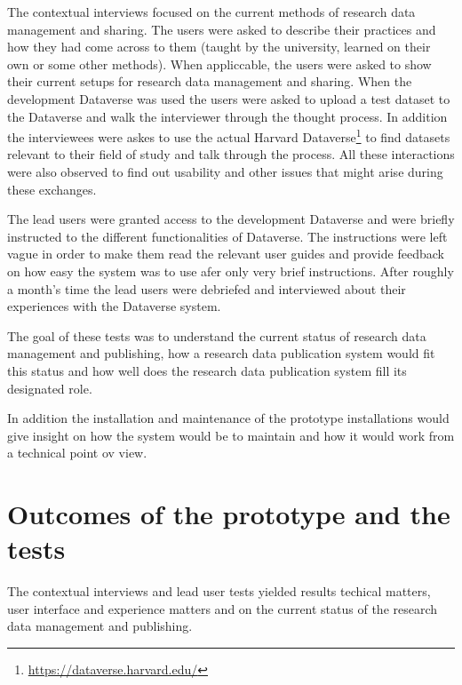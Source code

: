 The contextual interviews focused on the current methods of research data
management and sharing. The users were asked to describe their practices and
how they had come across to them (taught by the university, learned on their
own or some other methods). When appliccable, the users were asked to show
their current setups for research data management and sharing. When the
development Dataverse was used the users were asked to upload a test dataset
to the Dataverse and walk the interviewer through the thought process. In
addition the interviewees were askes to use the actual Harvard
Dataverse\footnote{\url{https://dataverse.harvard.edu/}} to find datasets
relevant to their field of study and talk through the process. All these
interactions were also observed to find out usability and other issues that
might arise during these exchanges.

The lead users were granted access to the development Dataverse and were
briefly instructed to the different functionalities of Dataverse. The
instructions were left vague in order to make them read the relevant user
guides and provide feedback on how easy the system was to use afer only very
brief instructions. After roughly a month's time the lead users were debriefed
and interviewed about their experiences with the Dataverse system.

The goal of these tests was to understand the current status of research data
management and publishing, how a research data publication system would fit
this status and how well does the research data publication system fill its
designated role.

In addition the installation and maintenance of the prototype installations
would give insight on how the system would be to maintain and how it would work
from a technical point ov view.

\section{Outcomes of the prototype and the tests}
\label{sec:prototype_outcomes}

The contextual interviews and lead user tests yielded results techical matters,
user interface and experience matters and on the current status of the research
data management and publishing.

